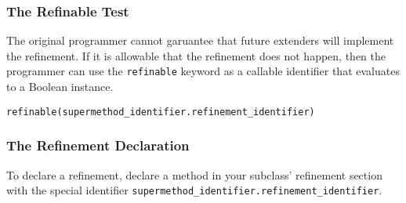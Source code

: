 \subsubsection{The Refinable Test}
The original programmer cannot garuantee that future extenders will implement the refinement. If it is allowable that the refinement does not happen, then the programmer can use the \verb!refinable! keyword as a callable identifier that evaluates to a Boolean instance.

\begin{lstlisting}
refinable(supermethod_identifier.refinement_identifier)
\end{lstlisting}

\subsubsection{The Refinement Declaration}
To declare a refinement, declare a method in your subclass' refinement section with the special identifier \verb!supermethod_identifier.refinement_identifier!.
